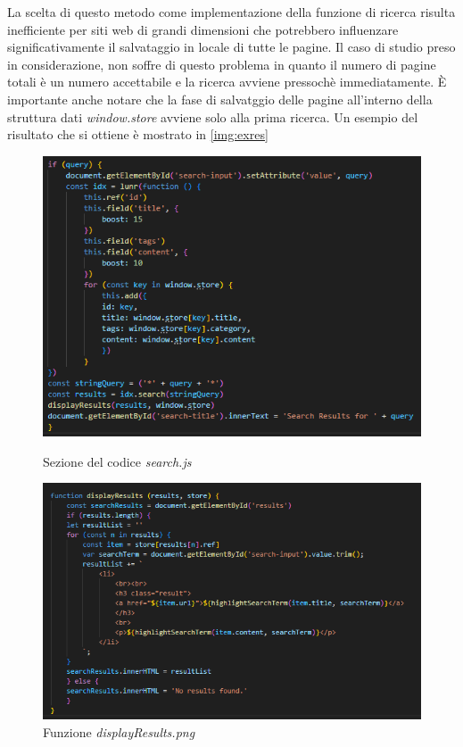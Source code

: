 \documentclass[target=bach,aauheader=]{thud}
\begin{document}
La scelta di questo metodo come implementazione della funzione di ricerca risulta inefficiente per siti web di grandi dimensioni che potrebbero influenzare significativamente il salvataggio in locale di tutte le pagine. 
\newline
Il caso di studio preso in considerazione, non soffre di questo problema in quanto il numero di pagine totali è un numero accettabile e la ricerca avviene pressochè immediatamente. 
\newline
È importante anche notare che la fase di salvatggio delle pagine all'interno della struttura dati \textit{window.store} avviene solo alla prima ricerca. 
\newline 
Un esempio del risultato che si ottiene è mostrato in \cref{img:exres}
\begin{figure}
    \begin{minipage}{0.5\textwidth}
      \centering
      \includegraphics[width=1\textwidth]{images/if-part.png}
      \caption{Sezione del codice \textit{search.js}}
      \label{img:ifpart}
    \end{minipage}
    \begin{minipage}{0.5\textwidth}
      \centering
      \includegraphics[width=1.18\textwidth]{images/displayResults.png}
      \caption{Funzione \textit{displayResults.png}}
      \label{img:results}
    \end{minipage}
\end{figure}
\end{document}
